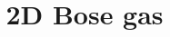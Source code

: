 \documentclass[8pt,letterpaper,notitlepage]{article}
\begin{document}
\title{2D Bose gas}

\maketitle


\end{document}
